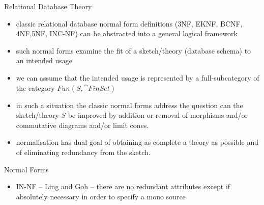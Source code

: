 \iffalse
\begin{frame}{Database Normal Forms}
\begin{itemize}
\item presentations (sketches) should be minimal and avoid redundancy:
\item how to make this precise?
\item in case of relational data model leads to 
   \begin{itemize}
     \item third normal form (3NF)
     \item Boyce-Codd normal form (BCNF)
     \item fourth normal form (4NF)
     \item fifth normal form (5NF)
   \end{itemize}
\end{itemize}
\end{frame}
\fi

\begin{frame}{Relational Database Theory}
\begin{itemize}
\item classic relational database normal form definitions ({\scriptsize 3NF, EKNF, BCNF, 4NF,5NF, INC-NF}) can be abstracted  into a general logical framework

\item such normal forms  examine the fit of a sketch/theory (database schema) to an intended usage

\item we can assume that the intended usage is represented by a full-subcategory of the category $Fun(S,\cat{FinSet})$

\item in such a situation the classic normal forms address the question can the sketch/theory $S$ be improved by addition or removal of morphisms and/or commutative diagrams and/or limit cones.
\item normalisation has dual goal of obtaining as complete a theory as possible and of eliminating redundancy from the sketch.  
\end{itemize}
\end{frame}

\begin{frame}{Normal Forms}
\begin{itemize}
\item IN-NF -- Ling and Goh -- there are no redundant attributes except if absolutely necessary in order to specify a mono source
\end{itemize}
\end{frame}

